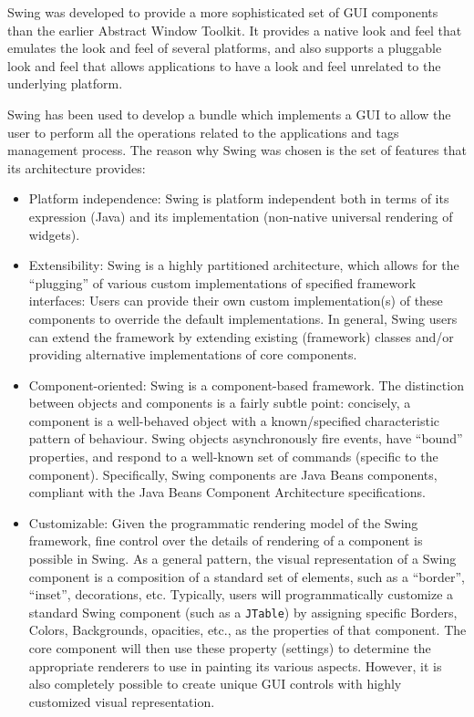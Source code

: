 Swing was developed to provide a more sophisticated set of GUI components than
the earlier Abstract Window Toolkit. 
It provides a native look and feel that emulates the look and feel of several
platforms, and also supports a pluggable look and feel that allows applications
to have a look and feel unrelated to the underlying platform.

Swing has been used to develop a bundle which implements a GUI to allow the
user to perform all the operations related to the applications and tags
management process. The reason why Swing was chosen is the set of features that
its architecture provides:

\begin{itemize}
	\item Platform independence: Swing is platform independent both in terms of
its expression (Java) and its implementation (non-native universal rendering of
widgets).

	\item Extensibility: Swing is a highly partitioned architecture, which allows
  for the ``plugging'' of various custom implementations of specified framework
  interfaces: Users can provide their own custom implementation(s) of these 
  components to override the default implementations. In general, Swing users 
  can extend the framework by extending existing (framework) classes and/or 
  providing alternative implementations of core components.

	\item Component-oriented:  Swing is a component-based framework. The
	distinction between objects and components is a fairly subtle point: 
	concisely, a component is a well-behaved object with a known/specified 
	characteristic pattern of behaviour. Swing objects asynchronously fire 
	events, have ``bound'' properties, and respond to a well-known set of 
	commands (specific to the component). Specifically, Swing components are  Java
	Beans components, compliant with the Java Beans Component Architecture 
	specifications.

	\item Customizable: Given the programmatic rendering model of the Swing
	framework, fine control over the details of rendering of a component is 
	possible in Swing. As a general pattern, the visual representation of a Swing 
	component is a composition of a standard set of elements, such as a
	``border'', ``inset'', decorations, etc. Typically, users will
	programmatically customize a standard Swing component (such as a
	\verb|JTable|) by assigning specific Borders, Colors, Backgrounds, opacities,
	etc., as the properties of that component. The core component  will then use
	these property (settings) to determine the appropriate renderers to use in
	painting its various aspects. However, it is also completely possible to
	create unique GUI controls with highly customized visual representation.


\end{itemize}
